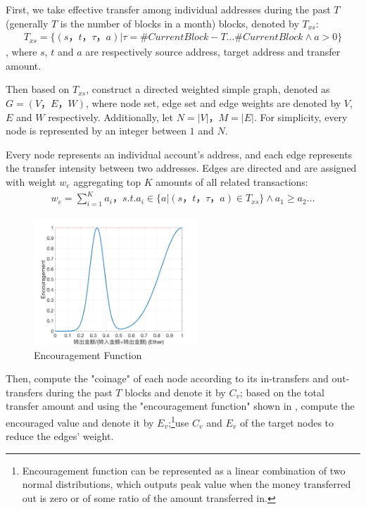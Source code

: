 First, we take effective transfer among  individual addresses during the past $T$ (generally $T$ is the number of blocks in a month) blocks, denoted by $T_{xs}$:
\begin{align}
T_{xs} = \{(s，t，\tau， a)| \tau = \#CurrentBlock-T \dots \#CurrentBlock \land a > 0 \}
\end{align}
, where $s$, $t$ and $a$ are respectively source address, target address and transfer amount.

Then based on $T_{xs}$, construct a directed weighted simple graph, denoted as $G=(V， E， W)$, where node set, edge set and edge weights are denoted by $V$, $E$ and $W$ respectively. Additionally, let $N = |V|$，$M = |E|$. For simplicity, every node is represented by an integer between $1$ and $N$.

Every node represents an individual account's address, and each edge represents the transfer intensity between two addresses. Edges are directed and are assigned with weight $w_e$ aggregating top $K$ amounts of all related transactions:
\begin{align}\label{formula:edgeweight}
w_e = \sum_{i=1}^K a_i， s.t. a_i \in \{a|(s，t，\tau，a) \in T_{xs} \} \land a_1 \geq a_2 \dots
\end{align}

\begin{figure}[h]
\centering
	\includegraphics[width=0.55\textwidth]{figs/encouragement.png}
	\caption{Encouragement Function}\label{fig:encouragement}
\end{figure}

Then, compute the "coinage" of each node according to its in-transfers and out-transfers during the past $T$ blocks and denote it by $C_v$; based on the total transfer amount and using the "encouragement function" shown in , compute the encouraged value and denote it by $E_v$;\footnote{Encouragement function can be represented as a linear combination of two normal distributions, which outputs peak value when the money transferred out is zero or of some ratio of the amount transferred in.}use  $C_v$ and $E_v$ of the target nodes to reduce the edges' weight.

